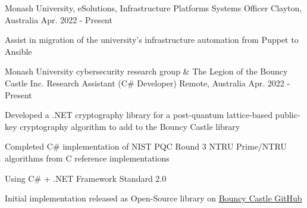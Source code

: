 

\begin{cventries}

  \cventry
  {Monash University, eSolutions, Infrastructure Platforms} %
  {Systems Officer} %
  {Clayton, Australia} %
  {Apr. 2022 - Present} %
  {
    \begin{cvitems} %
      \item {Assist in migration of the university's infrastructure automation from Puppet to Ansible}
    \end{cvitems}
  }

  \cventry
    {Monash University cybersecurity research group \& The Legion of the Bouncy Castle Inc.} %
    {Research Assistant (C\# Developer)} %
    {Remote, Australia} %
    {Apr. 2022 - Present} %
    {
      \begin{cvitems} %
        \item {Developed a .NET cryptography library for a post-quantum lattice-based public-key cryptography algorithm to add to the Bouncy Castle library}
        \item {Completed C\# implementation of NIST PQC Round 3 NTRU Prime/NTRU algorithms from C reference implementations}
        \item {Using C\# + .NET Framework Standard 2.0}
        \item {Initial implementation released as Open-Source library on \href{https://github.com/bcgit/bc-csharp}{Bouncy Castle GitHub}}
      \end{cvitems}
    }


\end{cventries}
\vspace{-3.0mm}